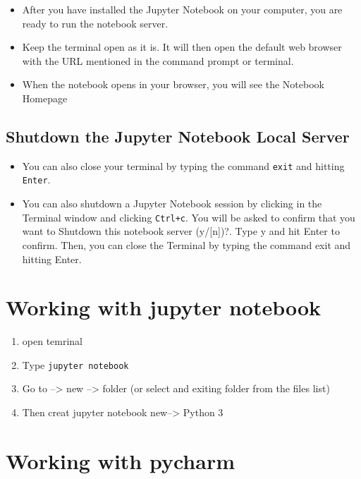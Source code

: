 \documentclass[
]{book}
\providecommand{\tightlist}{%
  \setlength{\itemsep}{0pt}\setlength{\parskip}{0pt}}
\begin{document}
\begin{itemize}
\item
  After you have installed the Jupyter Notebook on your computer, you are ready to run the notebook server.
\item
  Keep the terminal open as it is. It will then open the default web browser with the URL mentioned in the command prompt or terminal.
\item
  When the notebook opens in your browser, you will see the Notebook Homepage
\end{itemize}

\hypertarget{shutdown-the-jupyter-notebook-local-server}{%
\section{Shutdown the Jupyter Notebook Local Server}\label{shutdown-the-jupyter-notebook-local-server}}

\begin{itemize}
\item
  You can also close your terminal by typing the command \texttt{exit} and hitting \texttt{Enter}.
\item
  You can also shutdown a Jupyter Notebook session by clicking in the Terminal window and clicking \texttt{Ctrl+c}. You will be asked to confirm that you want to Shutdown this notebook server (y/{[}n{]})?. Type y and hit Enter to confirm. Then, you can close the Terminal by typing the command exit and hitting Enter.
\end{itemize}

\hypertarget{working-with-jupyter-notebook}{%
\chapter{Working with jupyter notebook}\label{working-with-jupyter-notebook}}

\begin{enumerate}
\def\labelenumi{\arabic{enumi}.}
\tightlist
\item
  open temrinal
\item
  Type \texttt{jupyter\ notebook}
\item
  Go to --\textgreater{} new --\textgreater{} folder (or select and exiting folder from the files list)
\item
  Then creat jupyter notebook
  new--\textgreater{} Python 3
\end{enumerate}

\hypertarget{working-with-pycharm}{%
\chapter{Working with pycharm}\label{working-with-pycharm}}
\end{document}
